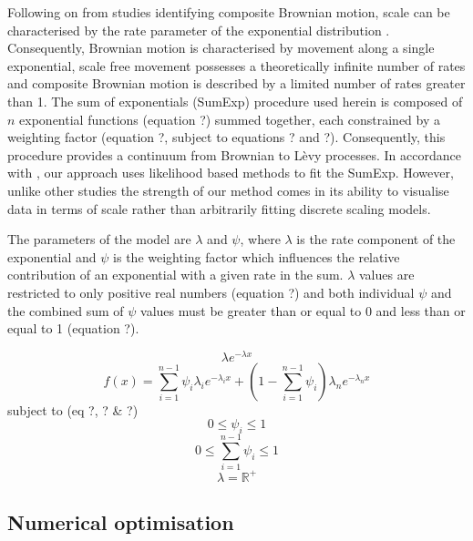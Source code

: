 \documentclass[11pt,usenames,dvipsnames]{article}
\begin{document}
Following on from studies identifying composite Brownian motion, scale can be characterised by the rate parameter of the exponential distribution \citep{Petrovskii2011}. Consequently, Brownian motion is characterised by movement along a single exponential, scale free movement possesses a theoretically infinite number of rates and composite Brownian motion is described by a limited number of rates greater than 1. The sum of exponentials (SumExp) procedure used herein is composed of $n$ exponential functions (equation ?) summed together, each constrained by a weighting factor (equation ?, subject to equations ? and ?). Consequently, this procedure provides a continuum from Brownian to L\`evy processes. In accordance with \cite{Murphy2007}, our approach uses likelihood based methods to fit the SumExp. However, unlike other studies \citep{Petrovskii2011, Sakamoto2017, Gautestad2012, Zhao2016} the strength of our method comes in its ability to visualise data in terms of scale rather than arbitrarily fitting discrete scaling models.

The parameters of the model are $\lambda$ and $\psi$, where $\lambda$ is the rate component of the exponential and $\psi$ is the weighting factor which influences the relative contribution of an exponential with a given rate in the sum. $\lambda$ values are restricted to only positive real numbers (equation ?) and both individual $\psi$ and the combined sum of $\psi$ values must be greater than or equal to 0 and less than or equal to 1 (equation ?).

\begin{equation}
\lambda e^{-\lambda x}
\end{equation}
\begin{equation}
f(x) = \sum_{i=1}^{n-1} \psi_i \lambda_i e^{-\lambda_i x} + \left(1 - \sum_{i=1}^{n-1}\psi_i\right) \lambda_n e^{-\lambda_n x}
\end{equation}
subject to (eq ?, ? \& ?)
\begin{equation}
0\leq \psi_i \leq 1
\end{equation}
\begin{equation}
0\leq \sum_{i=1}^{n-1}\psi_i \leq 1
\end{equation}
\begin{equation}
\lambda = \mathbb{R}^+
\end{equation}

\subsection{Numerical optimisation}
\end{document}
